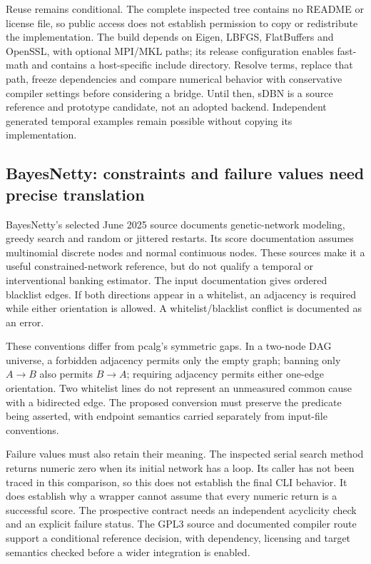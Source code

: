 Reuse remains conditional. The complete inspected tree contains no README
or license file, so public access does not establish permission to copy or
redistribute the implementation. The build depends on Eigen, LBFGS,
FlatBuffers and OpenSSL, with optional MPI/MKL paths; its release configuration
enables fast-math and contains a host-specific include directory. Resolve
terms, replace that path, freeze dependencies and compare numerical behavior
with conservative compiler settings before considering a bridge. Until then,
sDBN is a source reference and prototype candidate, not an adopted backend.
Independent generated temporal examples remain possible without copying its
implementation.\citep{exec16_ct_sdbn}

\subsection{BayesNetty: constraints and failure values need precise translation}

BayesNetty's selected June 2025 source documents genetic-network modeling,
greedy search and random or jittered restarts. Its score documentation assumes
multinomial discrete nodes and normal continuous nodes. These sources make it
a useful constrained-network reference, but do not qualify a temporal or
interventional banking estimator. The input documentation gives ordered
blacklist edges. If both directions appear in a whitelist, an adjacency is
required while either orientation is allowed. A whitelist/blacklist conflict
is documented as an error.\citep{exec16_ct_bayesnetty}

These conventions differ from pcalg's symmetric gaps. In a two-node DAG
universe, a forbidden adjacency permits only the empty graph; banning only
$A\to B$ also permits $B\to A$; requiring adjacency permits either one-edge
orientation. Two whitelist lines do not represent an unmeasured common cause
with a bidirected edge. The proposed conversion must preserve the predicate
being asserted, with endpoint semantics carried separately from input-file
conventions.\citep{exec16_ct_bayesnetty,exec16_ct_pcalg,exec16_ct_oracle}

Failure values must also retain their meaning. The inspected serial search
method returns numeric zero when its initial network has a loop. Its caller
has not been traced in this comparison, so this does not establish the final
CLI behavior. It does establish why a wrapper cannot assume that every numeric
return is a successful score. The prospective contract needs an independent
acyclicity check and an explicit failure status. The GPL3 source and documented
compiler route support a conditional reference decision, with dependency,
licensing and target semantics checked before a wider integration is enabled.
\citep{exec16_ct_bayesnetty,exec16_ct_design}


